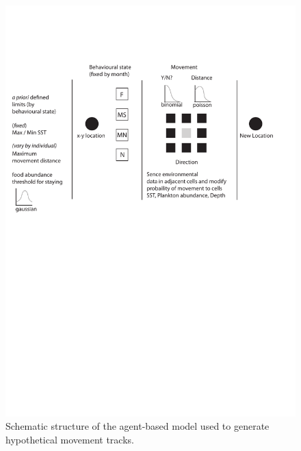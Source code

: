 \documentclass[a4paper,10pt]{article}
\begin{document}
\begin{landscape}

  \vspace{-1cm}
\begin{figure}[!htbp]
  \centering
  \includegraphics[trim = {3cm 0 0 0}, clip]{figures/flow-diagram-model.pdf}
  \linespread{0.8}
  \caption{
  Schematic structure of the agent-based model used to generate hypothetical movement tracks. 
}
\end{figure}
\end{landscape}
\end{document}
